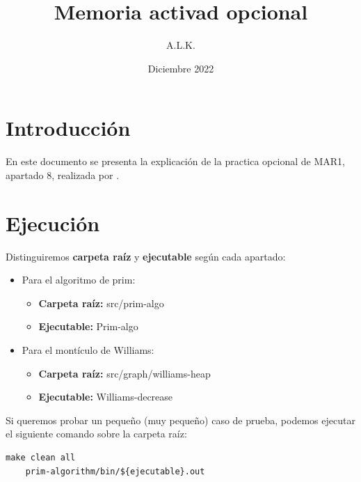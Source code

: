 \documentclass[6pt]{AiTex}
\title{Memoria activad opcional}
\author{A.L.K.}
\date{Diciembre 2022}
\begin{document}
\justify


\section*{Introducción}

En este documento se presenta la explicación de la practica opcional de MAR1, apartado 8, realizada por \autor.

\begin{multicols}{2}

    
    \vfill
    \hfill

    
\end{multicols}

\newpage

\section{Ejecución}

Distinguiremos \textbf{carpeta raíz} y \textbf{ejecutable} según cada apartado:
\begin{itemize}
    \item Para el algoritmo de prim:
          \begin{itemize}
              \item\textbf{Carpeta raíz:} src/prim-algo
              \item\textbf{Ejecutable:} Prim-algo
          \end{itemize}
    \item Para el montículo de Williams:
          \begin{itemize}
              \item\textbf{Carpeta raíz:} src/graph/williams-heap
              \item\textbf{Ejecutable:} Williams-decrease
          \end{itemize}
\end{itemize}

Si queremos probar un pequeño (muy pequeño) caso de prueba, podemos ejecutar el siguiente comando sobre la carpeta raíz:
\begin{lstlisting}[style=custombash]
    make clean all
    prim-algorithm/bin/${ejecutable}.out
    \end{lstlisting}
\end{document}
